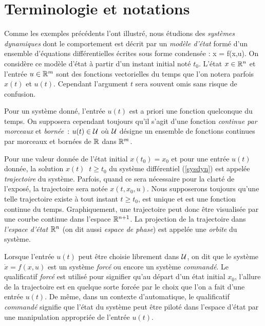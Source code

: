 \section{Terminologie et notations}

Comme les exemples précédents l'ont illustré, nous étudions des {\em systèmes
dynamiques} dont le comportement est décrit par un {\em modèle d'état} formé
d'un ensemble d'équations différentielles écrites sous forme condensée :
\eqn
\dot x = f(x,u). \label{sysdyn}
\eeqn
On considère ce modèle d'état à partir d'un instant initial noté $t_0$. 
L'état $x \in \mathbb{R}^n$ et l'entrée $u \in \mathbb{R}^m$ sont des fonctions vectorielles du
temps que l'on notera parfois $x(t)$ et $u(t)$.  Cependant
l'argument $t$ sera souvent omis sans risque de confusion.

Pour un système donné, l'entrée $u(t)$ est a priori une fonction quelconque du
temps.  On supposera cependant toujours qu'il s'agit d'une fonction {\em continue par morceaux} et {\em
bornée}~: $u(t) \in {\cal U}$ où ${\cal U}$ désigne un ensemble de fonctions continues par morceaux et 
bornées de $\mathbb{R}$ dans $\mathbb{R}^m$.

Pour une valeur donnée de l'état initial $x(t_0) = x_0$ et pour une entrée
$u(t)$ donnée, la solution $x(t) \;\; t \geq t_0$ du système différentiel
(\ref{sysdyn}) est appelée {\em trajectoire} du système.  Parfois, quand ce
sera nécessaire pour la clarté de l'exposé, la trajectoire sera notée
$x(t, x_0, u)$.  Nous supposerons toujours qu'une telle trajectoire existe
à tout instant $t\geq t_0$, est unique et est une fonction continue du temps.
Graphiquement, une trajectoire peut donc être visualisée par une courbe continue dans l'espace $\mathbb{R}^{n+1}$.  La projection de la trajectoire dans
{\em l'espace d'état} $\mathbb{R}^n$ (on dit aussi {\em espace de phase}) est appelée
une {\em orbite} du système.

Lorsque l'entrée $u(t)$ peut être choisie librement dans ${\cal U}$, on dit
que le système $\dot x = f(x,u)$ est un système {\em forcé} ou encore un
système {\em commandé}.  Le qualificatif {\em forcé} est utilisé pour
signifier qu'au départ d'un état initial $x_0$, l'allure de la trajectoire
est en quelque sorte forcée par le choix que l'on a fait d'une entrée $u(t)$. De même, dans un contexte d'automatique, le qualificatif {\em commandé}
signifie que l'état du système peut être piloté dans l'espace d'état par une manipulation appropriée de l'entrée $u(t)$.

